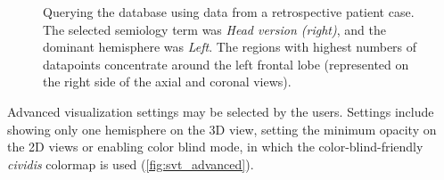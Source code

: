 \begin{figure}
  \centering
  \caption{
    Querying the database using data from a retrospective patient case.
    The selected semiology term was \textit{Head version (right)}, and the dominant hemisphere was \textit{Left}.
    The regions with highest numbers of datapoints concentrate around the left frontal lobe (represented on the right side of the axial and coronal views).
  }
  \label{fig:svt_case_heatmap}
\end{figure}

Advanced visualization settings may be selected by the users.
Settings include
showing only one hemisphere on the 3D view,
setting the minimum opacity on the 2D views or
enabling color blind mode, in which the color-blind-friendly \textit{cividis} colormap is used \cite{nunez_optimizing_2018} (\cref{fig:svt_advanced}).
